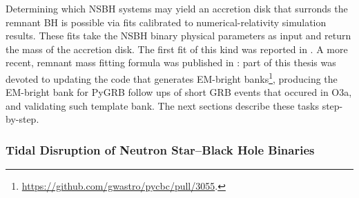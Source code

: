 \documentclass[binding=0.6cm, LaM]{sapthesis}
\begin{document}
        Determining which NSBH systems may yield an accretion disk that surronds the remnant BH is possible via fits calibrated to numerical-relativity simulation results.  These fits take the NSBH binary physical parameters as input and return the mass of the accretion disk.
        The first fit of this kind was reported in \cite{50}.
	A more recent, remnant mass fitting formula was published in \cite{54}:
        part of this thesis was devoted to updating the code that generates EM-bright banks\footnote{\url{https://github.com/gwastro/pycbc/pull/3055}.}, producing the EM-bright bank for {\ttfamily PyGRB} follow ups of short GRB events that occured in O3a, and validating such template bank.
	The next sections describe these tasks step-by-step.

\subsubsection{Tidal Disruption of Neutron Star--Black Hole Binaries}
\label{subsubsec:mrem_model}
\end{document}
